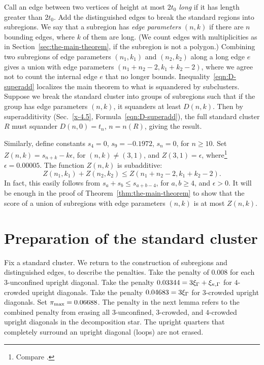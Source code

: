 Call an edge between two vertices of height at most $2t_0$ {\it long\/}
if it has length greater than $2t_0$. Add the distinguished edges to
break the standard regions into subregions. We say that a subregion has
{\it edge parameters} $(n,k)$ if there are $n$ bounding edges, where $k$
of them are long. (We count edges with multiplicities as in
Section~\ref{sec:the-main-theorem}, if the subregion is not a polygon.)
Combining two subregions of edge parameters $(n_1,k_1)$ and $(n_2,k_2)$
along a long edge $e$ gives a union with edge parameters
$(n_1+n_2-2,k_1+k_2-2)$, where we agree not to count the internal edge
$e$ that no longer bounds. Inequality~\ref{eqn:D-superadd} localizes the
main theorem to what is squandered by subclusters. Suppose we break the
standard cluster into groups of subregions such that if the group has
edge parameters $(n,k)$, it squanders at least $D(n,k)$. Then by
superadditivity (Sec.~\ref{x-4.5}, Formula~\ref{eqn:D-superadd}), the
full standard cluster $R$ must squander $D(n,0) = t_n$, $n=n(R)$, giving
the result.

Similarly, define constants $s_4=0$, $s_9 = -0.1972$, $s_{n}=0$, for
$n\ge10$.  Set $Z(n,k) = s_{n+k}-k\epsilon$, for $(n,k)\ne (3,1)$, and
$Z(3,1)=\epsilon$, where\footnote{Compare .} %
 $\epsilon=0.00005$. The function
$Z(n,k)$ is subadditive:
    $$Z(n_1,k_1)+Z(n_2,k_2) \le Z(n_1+n_2-2,k_1+k_2-2).$$
In fact, this easily follows from $s_a+s_b\le s_{a+b-4}$, for $a,b\ge
4$, and $\epsilon>0$. It will be enough in the proof of
Theorem~\ref{thm:the-main-theorem} to show that the score of a union of
subregions with edge parameters $(n,k)$ is at most $Z(n,k)$.


\section{Preparation of the standard cluster}
   \label{sec:prep-cluster}

Fix a standard cluster.  We return to the construction of
subregions and distinguished edges, to describe the penalties.
Take the penalty of $0.008$ for each $3$-unconfined upright
diagonal. Take the penalty $0.03344 = 3\xi_\Gamma+\xi_{\kappa,\Gamma}$ for $4$-crowded
upright diagonals. Take the penalty $0.04683=3\xi_\Gamma$ for
$3$-crowded upright diagonals. Set $\pi_{\max}=0.06688$. The penalty
in the next lemma refers to the combined penalty from erasing all
$3$-unconfined, $3$-crowded, and $4$-crowded upright diagonals in
the decomposition star. The upright quarters that completely
surround an upright diagonal (loops) are not erased.

